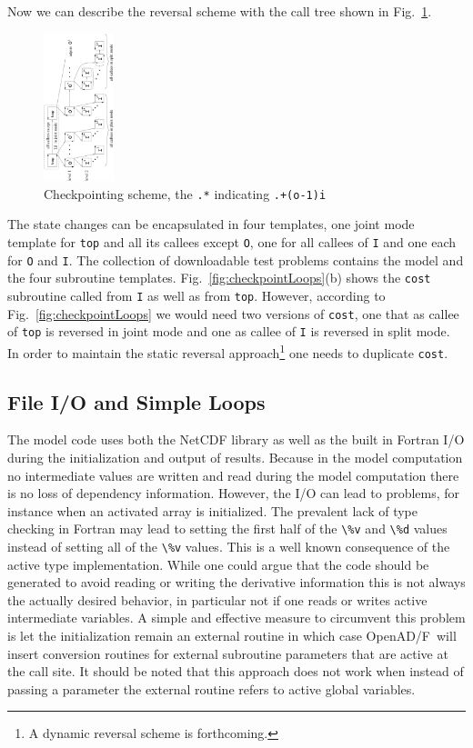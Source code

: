 \documentclass{book}
\newcommand{\OpenADF}{OpenAD/F}
\newcommand{\reffig}[1]{{Fig.~\ref{#1}}}
\begin{document}
Now we can describe the reversal scheme with the call tree shown in \reffig{fig:checkpointct}.
\begin{figure}
\begin{center}
\includegraphics[height=4.3cm]{swMode}
\end{center}
\caption{Checkpointing scheme, the \lstinline{.*} indicating \lstinline{.+(o-1)i}} \label{fig:checkpointct}
\end{figure}
The state changes can be encapsulated in four templates, one joint mode template for \lstinline{top}
and all its callees except \lstinline{O}, one for all callees of \lstinline{I} and one  each for 
\lstinline{O} and \lstinline{I}.  
The collection of downloadable test problems contains the 
model and the four subroutine templates.
\reffig{fig:checkpointLoops}(b) shows the \lstinline{cost} subroutine called from 
\lstinline{I} as well as from \lstinline{top}. 
However, according to \reffig{fig:checkpointLoops} we would need two versions of 
\lstinline{cost}, one that as callee of \lstinline{top} is reversed in joint mode and 
one as callee of \lstinline{I} is reversed in split mode. In order to maintain 
the static reversal approach\footnote{
A dynamic reversal scheme is forthcoming.
}
one needs to duplicate \lstinline{cost}.

\subsection{File I/O and Simple Loops}
The model code uses both the NetCDF library as well as 
the built in Fortran I/O during the initialization and 
output of results. Because  in the model computation 
no intermediate values are written and read during 
the model computation there is no loss of dependency information. 
However, the I/O can lead to problems, for instance 
when an activated array is initialized. The prevalent 
lack of type checking in Fortran may lead to setting 
the first half of the \lstinline{\%v} and \lstinline{\%d} values 
instead of setting all of the \lstinline{\%v} values. 
This is a well known consequence of the active type 
implementation. While one could argue that the code should 
be generated to avoid reading or writing the derivative information
this is not always the actually desired behavior, in particular 
not if one reads or writes active intermediate variables. 
A simple and effective measure to circumvent this problem 
is let the initialization remain an external routine 
in which case \OpenADF\ will insert conversion routines 
for external subroutine parameters that are active at the 
call site. 
It should be noted that this approach does not work 
when instead of passing a parameter the external routine refers 
to active global variables.
  
\end{document}
